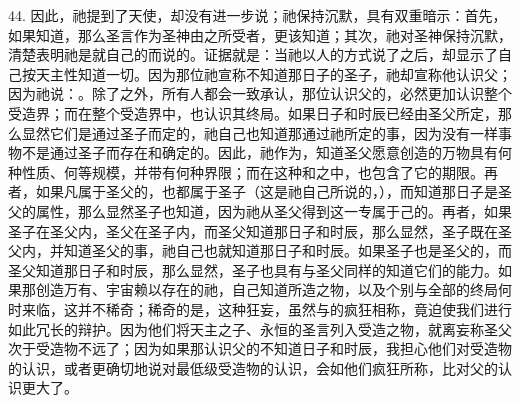 44. 因此，祂提到了天使，却没有进一步说；祂保持沉默，具有双重暗示：首先，如果知道，那么圣言作为圣神由之所受者，更该知道；其次，祂对圣神保持沉默，清楚表明祂是就自己的而说的。证据就是：当祂以人的方式说了之后，却显示了自己按天主性知道一切。因为那位祂宣称不知道那日子的圣子，祂却宣称他认识父；因为祂说：。除了之外，所有人都会一致承认，那位认识父的，必然更加认识整个受造界；而在整个受造界中，也认识其终局。如果日子和时辰已经由圣父所定，那么显然它们是通过圣子而定的，祂自己也知道那通过祂所定的事，因为没有一样事物不是通过圣子而存在和确定的。因此，祂作为，知道圣父愿意创造的万物具有何种性质、何等规模，并带有何种界限；而在这种和之中，也包含了它的期限。再者，如果凡属于圣父的，也都属于圣子（这是祂自己所说的，），而知道那日子是圣父的属性，那么显然圣子也知道，因为祂从圣父得到这一专属于己的。再者，如果圣子在圣父内，圣父在圣子内，而圣父知道那日子和时辰，那么显然，圣子既在圣父内，并知道圣父的事，祂自己也就知道那日子和时辰。如果圣子也是圣父的，而圣父知道那日子和时辰，那么显然，圣子也具有与圣父同样的知道它们的能力。如果那创造万有、宇宙赖以存在的祂，自己知道所造之物，以及个别与全部的终局何时来临，这并不稀奇；稀奇的是，这种狂妄，虽然与的疯狂相称，竟迫使我们进行如此冗长的辩护。因为他们将天主之子、永恒的圣言列入受造之物，就离妄称圣父次于受造物不远了；因为如果那认识父的不知道日子和时辰，我担心他们对受造物的认识，或者更确切地说对最低级受造物的认识，会如他们疯狂所称，比对父的认识更大了。\par

